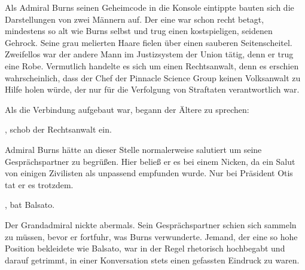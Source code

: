 \par

Als Admiral Burns seinen Geheimcode in die Konsole eintippte bauten sich die Darstellungen von zwei Männern auf. Der eine war schon recht betagt, mindestens so alt wie Burns selbst und trug einen kostspieligen, seidenen Gehrock. Seine grau melierten Haare fielen über einen sauberen Seitenscheitel. Zweifellos war der andere Mann im Justizsystem der Union tätig, denn er trug eine Robe. Vermutlich handelte es sich um einen Rechtsanwalt, denn es erschien wahrscheinlich, dass der Chef der Pinnacle Science Group keinen Volksanwalt zu Hilfe holen würde, der nur für die Verfolgung von Straftaten verantwortlich war.

\par

Als die Verbindung aufgebaut war, begann der Ältere zu sprechen: 

\par

, schob der Rechtsanwalt ein.

\par

Admiral Burns hätte an dieser Stelle normalerweise salutiert um seine Gesprächspartner zu begrüßen. Hier beließ er es bei einem Nicken, da ein Salut von einigen Zivilisten als unpassend empfunden wurde. Nur bei Präsident Otis tat er es trotzdem.

\par

, bat Balsato. 

\par

Der Grandadmiral nickte abermals. Sein Gesprächspartner schien sich sammeln zu müssen, bevor er fortfuhr, was Burns verwunderte. Jemand, der eine so hohe Position bekleidete wie Balsato, war in der Regel rhetorisch hochbegabt und darauf getrimmt, in einer Konversation stets einen gefassten Eindruck zu waren. 

